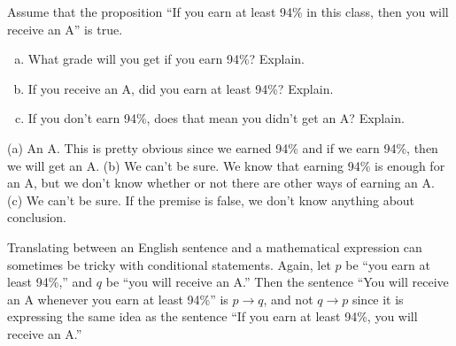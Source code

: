 \begin{ques}
Assume that the proposition ``If you earn at least 94\% in this class, then
you will receive an A'' is true.
\begin{enumerate}[(a)]
\item What grade will you get if you earn 94\%?  Explain.\\
\answerlinetwo
\item If you receive an A, did you earn at least 94\%? Explain.\\
\answerlinetwo
\item If you don't earn 94\%, does that mean you didn't get an A? Explain.\\
\answerlinetwo
\end{enumerate}
\begin{answer}
(a) An A. This is pretty obvious since we earned 94\% and if we
earn 94\%, then we will get an A.
(b) We can't be sure.  We know that earning 94\% is enough for an A, but we don't know
whether or not there are other ways of earning an A.
(c) We can't be sure.  If the premise is false, we don't know anything about conclusion.
\end{answer}
\end{ques}

\begin{exa}
Translating between an English sentence and a mathematical expression
can sometimes be tricky with conditional statements.
Again, let 
$p$ be ``you earn at least 94\%,'' and $q$ be ``you will receive an A.''
Then the sentence ``You will receive an A whenever you earn at least 94\%''
is $p\rightarrow q$, and not $q\rightarrow p$ since it is expressing
the same idea as the sentence ``If you earn at least 94\%, you will receive an A.''
\end{exa}

